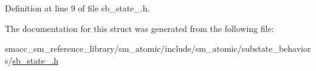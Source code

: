 Definition at line 9 of file sb\+\_\+state\+\_.\+h.



The documentation for this struct was generated from the following file\+:\begin{DoxyCompactItemize}
\item 
smacc\+\_\+sm\+\_\+reference\+\_\+library/sm\+\_\+atomic/include/sm\+\_\+atomic/substate\+\_\+behaviors/\hyperlink{sb__state__1_8h}{sb\+\_\+state\+\_.\+h}\end{DoxyCompactItemize}
